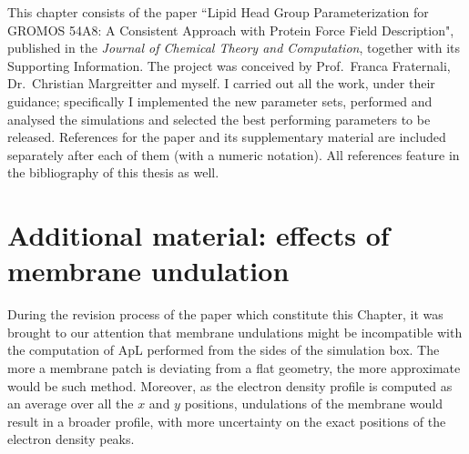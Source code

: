 This chapter consists of the paper ``Lipid Head Group Parameterization for GROMOS 54A8: A Consistent Approach with Protein Force Field Description", published in the \emph{Journal of Chemical Theory and Computation}, together with its Supporting Information. The project was conceived by Prof.\ Franca Fraternali, Dr.\ Christian Margreitter and myself. I carried out all the work, under their guidance; specifically I implemented the new parameter sets, performed and analysed the simulations and selected the best performing parameters to be released. References for the paper and its supplementary material are included separately after each of them (with a numeric notation). All references feature in the bibliography of this thesis as well.








%
%
%
\clearpage

\section{Additional material: effects of membrane undulation}

During the revision process of the paper which constitute this Chapter, it was brought to our attention that membrane undulations might be incompatible with the computation of ApL performed from the sides of the simulation box. The more a membrane patch is deviating from a flat geometry, the more approximate would be such method.
%
Moreover, as the electron density profile is computed as an average over all the $x$ and $y$ positions, undulations of the membrane would result in a broader profile, with more uncertainty on the exact positions of the electron density peaks.

